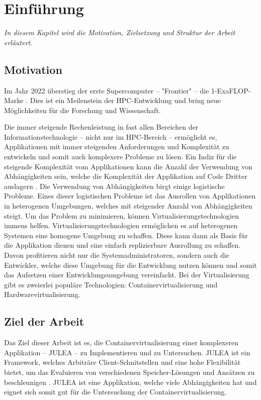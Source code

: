 \chapter{Einführung}
\label{cha:introduction}

\textit{In diesem Kapitel wird die Motivation, Zielsetzung und Struktur der Arbeit erläutert.}


\section{Motivation}
Im Jahr 2022 überstieg der erste Supercomputer – "Frontier" – die 1-ExaFLOP-Marke \cite[Vgl. 567ff]{rajaramanFrontierWorldsFirst2023}. Dies ist ein Meilenstein der HPC-Entwicklung und bring neue Möglichkeiten für die Forschung und Wissenschaft.

Die immer steigende Rechenleistung in fast allen Bereichen der Informationstechnologie – nicht nur im HPC-Bereich – ermöglicht es, Applikationen mit immer steigenden Anforderungen und Komplexität zu entwickeln und somit auch komplexere Probleme zu lösen. Ein Indiz für die steigende Komplexität vom Applikationen kann die Anzahl der Verwendung von Abhängigkeiten sein, welche die Komplexität der Applikation auf Code Dritter auslagern \cite[Vgl. Abbildung 2.4]{2024StateSoftware}. Die Verwendung von Abhängigkeiten birgt einige logistische Probleme. Eines dieser logistischen Probleme ist das Ausrollen von Applikationen in heterogenen Umgebungen, welches mit steigender Anzahl von Abhängigkeiten steigt. Um das Problem zu minimieren, können Virtualisierungstechnologien immens helfen. Virtualisierungstechnologien ermöglichen es auf heterogenen Systemen eine homogene Umgebung zu schaffen. Diese kann dann als Basis für die Applikation dienen und eine einfach replizierbare Ausrollung zu schaffen. Davon profitieren nicht nur die Systemadministratoren, sondern auch die Entwickler, welche diese Umgebung für die Entwicklung nutzen können und somit das Aufsetzen einer Entwicklungsumgebung vereinfacht. Bei der Virtualisierung gibt es zweierlei populäre Technologien: Containervirtualisierung und Hardwarevirtualisierung. 

\section{Ziel der Arbeit}

Das Ziel dieser Arbeit ist es, die Containervirtualisierung einer komplexeren Applikation – JULEA – zu Implementieren und zu Untersuchen. JULEA \cite{kuhnJULEAFlexibleStorage2017} ist ein Framework, welches Arbiträre Client-Schnitstellen und eine hohe Flexibilität bietet, um das Evaluieren von verschiedenen Speicher-Lösungen und Ansätzen zu beschleunigen \cite[Vgl. 1]{kuhnJULEAFlexibleStorage2017}. JULEA ist eine Applikation, welche viele Abhängigkeiten hat und eignet sich somit gut für die Untersuchung der Containervirtualisierung.

